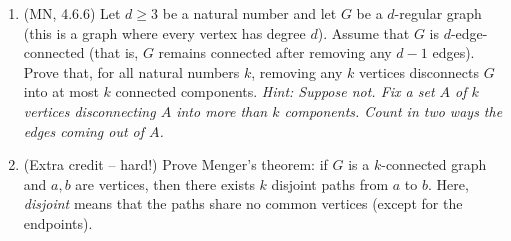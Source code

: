 \documentclass{amsart}
\theoremstyle{definition}
\begin{document}
\begin{enumerate}
  \item (MN, 4.6.6) Let $d \ge 3$ be a natural number and let $G$ be a $d$-regular graph (this is a graph where every vertex has degree $d$). Assume that $G$ is $d$-edge-connected (that is, $G$ remains connected after removing any $d - 1$ edges). Prove that, for all natural numbers $k$, removing any $k$ vertices disconnects $G$ into at most $k$ connected components. \emph{Hint: Suppose not. Fix a set $A$ of $k$ vertices disconnecting $A$ into more than $k$ components. Count in two ways the edges coming out of $A$.}

  \item (Extra credit -- hard!) Prove Menger's theorem: if $G$ is a $k$-connected graph and $a, b$ are vertices, then there exists $k$ disjoint paths from $a$ to $b$. Here, \emph{disjoint} means that the paths share no common vertices (except for the endpoints).
\end{enumerate}
\end{document}
